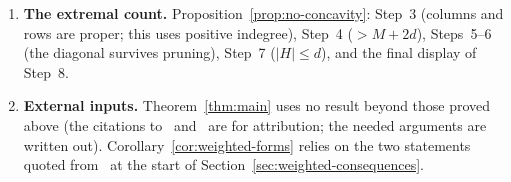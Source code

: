 \documentclass[11pt]{article}
\theoremstyle{remark}
\newcommand{\abs}[1]{\lvert #1\rvert}
\DeclareMathOperator{\rank}{rank}
\begin{document}
\begin{enumerate}[leftmargin=2em]
 Step~10 ($\dim\ker A\ge k$).  Step~4 (maximality of $\alpha$ and
 $\beta$) is what makes $\rank L\le\ell$ and $\rank N\le t$.
\item \textbf{The extremal count.}
 Proposition~\ref{prop:no-concavity}: Step~3 (columns and rows are proper;
 this uses positive indegree), Step~4 ($>M+2d$), Steps~5--6 (the diagonal
 survives pruning), Step~7 ($\abs H\le d$), and the final display of
 Step~8.
\item \textbf{External inputs.}  Theorem~\ref{thm:main} uses no result
 beyond those proved above (the citations to~\cite{Edmonds1967}
 and~\cite{konig1931} are for attribution; the needed arguments are
 written out).  Corollary~\ref{cor:weighted-forms} relies on the two
 statements quoted from~\cite{Seacrest2015} at the start of
 Section~\ref{sec:weighted-consequences}.
\end{enumerate}



\end{document}
